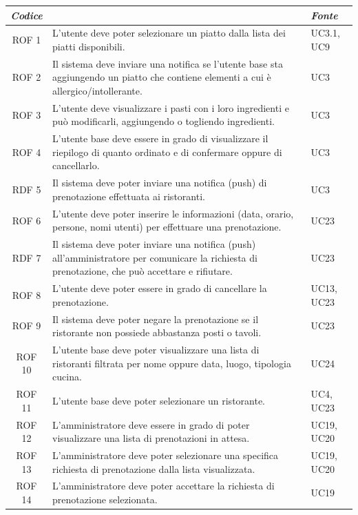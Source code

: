 \documentclass[12pt, oneside]{article}
\begin{document}
\begin{longtable}{|c|p{14cm}|p{2cm}|}
    \hline
    \emph{Codice} & \centering{\emph{Descrizione}} &  \emph{Fonte} \\
    \hline
    \endfirsthead
    \endhead

    ROF 1&  L'utente deve poter selezionare un piatto dalla lista dei piatti disponibili.  & UC3.1, UC9  \\
    \hline
    ROF 2& Il sistema deve inviare una notifica se l'utente base sta aggiungendo un piatto che contiene elementi a cui è allergico/intollerante. & UC3\\
    \hline
    ROF 3& L'utente deve visualizzare i pasti con i loro ingredienti e può modificarli, aggiungendo o togliendo ingredienti. & UC3\\
    \hline
    ROF 4& L'utente base deve essere in grado di visualizzare il riepilogo di quanto ordinato e di confermare oppure di cancellarlo. & UC3 \\
    \hline
    RDF 5& Il sistema deve poter inviare una notifica (push) di prenotazione effettuata ai ristoranti.& UC3 \\
    \hline
    ROF 6& L'utente deve poter inserire le informazioni (data, orario, persone, nomi utenti) per effettuare una prenotazione. & UC23\\
    \hline
    RDF 7& Il sistema deve poter inviare una notifica (push) all'amministratore per comunicare la richiesta di prenotazione, che può accettare e rifiutare. & UC23\\
    \hline
    ROF 8& L'utente deve poter essere in grado di cancellare la prenotazione. & UC13, UC23 \\
    \hline
    ROF 9& Il sistema deve poter negare la prenotazione se il ristorante non possiede abbastanza posti o tavoli. & UC23 \\
    \hline
    ROF 10& L'utente base deve poter visualizzare una lista di ristoranti filtrata per nome oppure data, luogo, tipologia cucina. & UC24 \\
    \hline
    ROF 11& L'utente base deve poter selezionare un ristorante.  & UC4, UC23 \\
    \hline
    ROF 12& L'amministratore deve essere in grado di poter visualizzare una lista di prenotazioni in attesa. & UC19, UC20 \\
    \hline
    ROF 13& L'amministratore deve poter selezionare una specifica richiesta di prenotazione dalla lista visualizzata. & UC19, UC20 \\
    \hline
    ROF 14& L'amministratore deve poter accettare la richiesta di prenotazione selezionata. & UC19 \\

\end{longtable}
\end{document}
